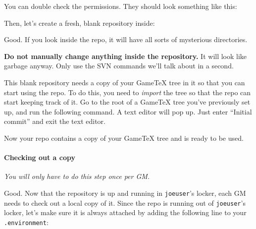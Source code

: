 \documentclass[green]{testgame}
\begin{document}
You can double check the permissions. They should look something like
this:


Then, let's create a fresh, blank repository inside:


Good. If you look inside the repo, it will have all sorts of
mysterious directories. 


{\bf Do not manually change anything inside the repository.} It will
look like garbage anyway. Only use the SVN commands we'll talk about
in a second.

This blank repository needs a copy of your GameTeX tree in it so that
you can start using the repo. To do this, you need to {\em import} the
tree so that the repo can start keeping track of it. Go to the root of
a GameTeX tree you've previously set up, and run the following
command. A text editor will pop up. Just enter ``Initial commit'' and
exit the text editor.


Now your repo contains a copy of your GameTeX tree and is ready to be
used.

\paragraph*{Checking out a copy}

{\em You will only have to do this step once per GM.}

Good. Now that the repository is up and running in {\tt joeuser}'s
locker, each GM needs to check out a local copy of it. Since the repo
is running out of {\tt joeuser}'s locker, let's make sure it is always
attached by adding the following line to your {\tt .environment}:
\end{document}
